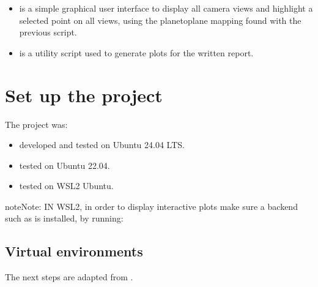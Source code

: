 \documentclass[letterpaper,10pt,english]{sphinxmanual}
\begin{document}
\begin{enumerate}
\begin{itemize}
\item {} 
\sphinxAtStartPar
{} is a simple graphical user interface to display all camera views and highlight a selected point on all views, using the plane\sphinxhyphen{}to\sphinxhyphen{}plane mapping found with the previous script.

\item {} 
\sphinxAtStartPar
{} is a utility script used to generate plots for the written report.

\end{itemize}

\end{enumerate}

\sphinxstepscope


\chapter{Set up the project}
\label{\detokenize{setup:set-up-the-project}}\label{\detokenize{setup:setup}}\label{\detokenize{setup::doc}}
\sphinxAtStartPar
The project was:
\begin{itemize}
\item {} 
\sphinxAtStartPar
developed and tested on Ubuntu 24.04 LTS.

\item {} 
\sphinxAtStartPar
tested on Ubuntu 22.04.

\item {} 
\sphinxAtStartPar
tested on WSL2 \sphinxhyphen{} Ubuntu.

\end{itemize}

\begin{sphinxadmonition}{note}{Note:}
\sphinxAtStartPar
IN WSL2, in order to display interactive plots make sure a backend such as  is installed, by running:

\begin{sphinxVerbatim}[commandchars=\\\{\}]
   
\end{sphinxVerbatim}
\end{sphinxadmonition}


\section{Virtual environments}
\label{\detokenize{setup:virtual-environments}}
\sphinxAtStartPar
The next steps are adapted from .
\end{document}
